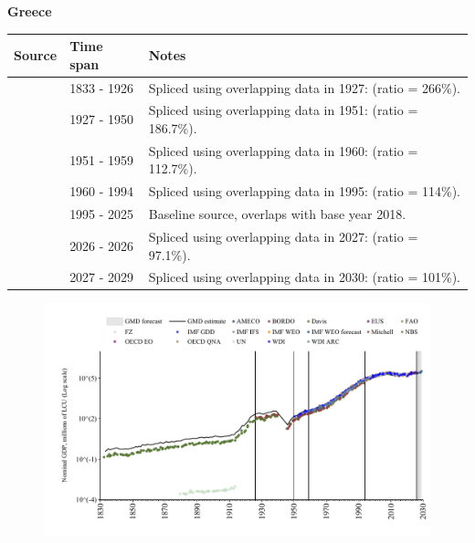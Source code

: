 \documentclass[12pt,a4paper,landscape]{article}
\begin{document}
\begin{adjustbox}{max totalsize={\paperwidth}{\paperheight},center}
\begin{minipage}[t][\textheight][t]{\textwidth}
\vspace*{0.5cm}
{}
\begin{center}
{\Large\bfseries Greece}
\end{center}
\vspace{0.5cm}
\begin{table}[H]
\centering
\small
\begin{tabular}{|l|l|l|}
\hline
\textbf{Source} & \textbf{Time span} & \textbf{Notes} \\
\hline
\rowcolor{white}\cite{NBS}& 1833 - 1926 &Spliced using overlapping data in 1927: (ratio = 266\%).\\
\rowcolor{lightgray}\cite{Mitchell}& 1927 - 1950 &Spliced using overlapping data in 1951: (ratio = 186.7\%).\\
\rowcolor{white}\cite{IMF_GDD}& 1951 - 1959 &Spliced using overlapping data in 1960: (ratio = 112.7\%).\\
\rowcolor{lightgray}\cite{AMECO}& 1960 - 1994 &Spliced using overlapping data in 1995: (ratio = 114\%).\\
\rowcolor{white}\cite{OECD_EO}& 1995 - 2025 &Baseline source, overlaps with base year 2018.\\
\rowcolor{lightgray}\cite{AMECO}& 2026 - 2026 &Spliced using overlapping data in 2027: (ratio = 97.1\%).\\
\rowcolor{white}\cite{IMF_WEO_forecast}& 2027 - 2029 &Spliced using overlapping data in 2030: (ratio = 101\%).\\
\hline
\end{tabular}
\end{table}
\begin{figure}[H]
\centering
\includegraphics[width=\textwidth,height=0.6\textheight,keepaspectratio]{graphs/GRC_nGDP.pdf}
\end{figure}
\end{minipage}
\end{adjustbox}
\end{document}
